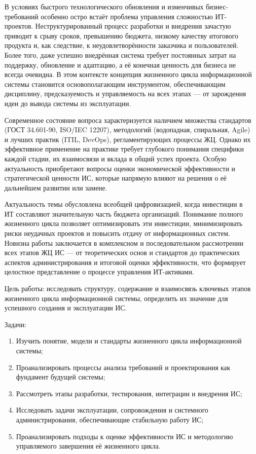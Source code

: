 \documentclass{SibFU-docs}
\begin{document}
В условиях быстрого технологического обновления и изменчивых бизнес-требований особенно остро встаёт проблема управления сложностью ИТ-проектов. Неструктурированный процесс разработки и внедрения зачастую приводит к срыву сроков, превышению бюджета, низкому качеству итогового продукта и, как следствие, к неудовлетворённости заказчика и пользователей. Более того, даже успешно внедрённая система требует постоянных затрат на поддержку, обновление и адаптацию, а её конечная ценность для бизнеса не всегда очевидна. В этом контексте концепция жизненного цикла информационной системы становится основополагающим инструментом, обеспечивающим дисциплину, предсказуемость и управляемость на всех этапах — от зарождения идеи до вывода системы из эксплуатации.

Современное состояние вопроса характеризуется наличием множества стандартов (ГОСТ 34.601-90, ISO/IEC 12207), методологий (водопадная, спиральная, Agile) и лучших практик (ITIL, DevOps), регламентирующих процессы ЖЦ. Однако их эффективное применение на практике требует глубокого понимания специфики каждой стадии, их взаимосвязи и вклада в общий успех проекта. Особую актуальность приобретают вопросы оценки экономической эффективности и стратегической ценности ИС, которые напрямую влияют на решения о её дальнейшем развитии или замене.

Актуальность темы обусловлена всеобщей цифровизацией, когда инвестиции в ИТ составляют значительную часть бюджета организаций. Понимание полного жизненного цикла позволяет оптимизировать эти инвестиции, минимизировать риски неудачных проектов и повысить отдачу от информационных систем. Новизна работы заключается в комплексном и последовательном рассмотрении всех этапов ЖЦ ИС — от теоретических основ и стандартов до практических аспектов администрирования и итоговой оценки эффективности, что формирует целостное представление о процессе управления ИТ-активами.

Цель работы: исследовать структуру, содержание и взаимосвязь ключевых этапов жизненного цикла информационной системы, определить их значение для успешного создания и эксплуатации ИС.

Задачи:
\begin{enumerate}
    \item Изучить понятие, модели и стандарты жизненного цикла информационной системы;
    \item Проанализировать процессы анализа требований и проектирования как фундамент будущей системы;
    \item Рассмотреть этапы разработки, тестирования, интеграции и внедрения ИС;
    \item Исследовать задачи эксплуатации, сопровождения и системного администрирования, обеспечивающие стабильную работу ИС;
    \item Проанализировать подходы к оценке эффективности ИС и методологию управляемого завершения её жизненного цикла.
\end{enumerate}
\end{document}
